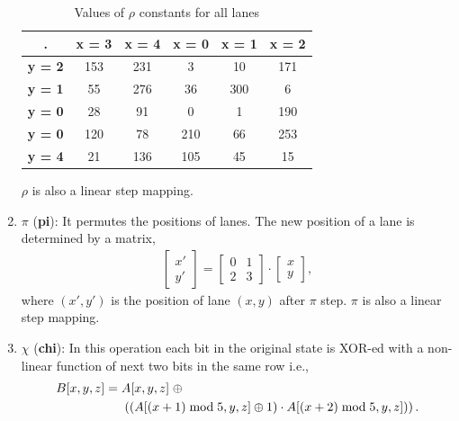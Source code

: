 \begin{enumerate}
		\begin{table}[h!]
			\begin{center}
				\begin{tabular}{c|c|c|c|c|c}
					\textbf{.} & \textbf{x = 3} & \textbf{x = 4} & \textbf{x = 0} & \textbf{x = 1} & \textbf{x = 2}\\ %
					\hline
					\textbf{y = 2} & 153 & 231 & 3 & 10 & 171\\ %
					\hline
					\textbf{y = 1} & 55 & 276 & 36 & 300 & 6\\ %
					\hline
					\textbf{y = 0} & 28 & 91 & 0 & 1 & 190\\ %
					\hline
					\textbf{y = 0} & 120 & 78 & 210 & 66 & 253\\ %
					\hline
					\textbf{y = 4} & 21 & 136 & 105 & 45 & 15\\ %
					\hline
				\end{tabular}
				\caption{Values of $\rho$ constants for all lanes}\label{tab4}
			\end{center}
		\end{table}                                                                 
		$\rho$ is also a linear step mapping.

    \vskip5pt
    \item $\pi$ ({\bf pi}): It permutes the positions of lanes. The new position of a lane is determined by a matrix, 
    \begin{align}
    \begin{bmatrix} x'\\ y'\end{bmatrix} = 
    \begin{bmatrix} 0 & 1 \\ 2 &  3 \end{bmatrix} \cdot \begin{bmatrix} x\\ y\end{bmatrix},
    \end{align}
    where $(x', y')$ is the position of lane $(x, y)$ after $\pi$ step.
		$\pi$ is also a linear step mapping.
    \vskip5pt
    \item $\chi$ ({\bf chi}): In this operation each bit in the original state is XOR-ed with a non-linear function of next two bits in the same row i.e.,
    \begin{align}\nonumber
        B[x, y, z] &=  A[x, y, z] \;\oplus \\
        & \hspace{0.5cm} \left( \left(A[ (x + 1 )\bmod 5, y, z] \oplus 1\right) \cdot  A[ (x + 2) \bmod 5, y, z] ) \right).
    \end{align}
    

\end{enumerate}
